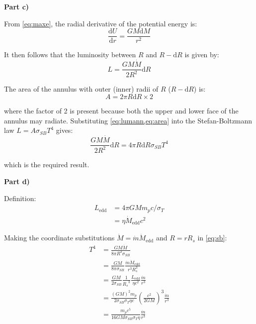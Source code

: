 \documentclass{article}
\newcommand{\diff}[1]{\mathrm{d}#1}
\newcommand{\mysection}[1]{{\large{\bf #1}}}
\begin{document}
\vspace{\baselineskip}
\mysection{Part c)}

From \cref{eq:maxe}, the radial derivative of the potential energy is:
\begin{equation}
  \label{eq:dUdr}
  \frac{\diff{U}}{\diff{r}}=\frac{GM\diff{M}}{r^2}
\end{equation}

It then follows that the luminosity between $R$ and $R-\diff{R}$ is given by:
\begin{equation}
  \label{eq:lumann}
  L=\frac{GM\dot{M}}{2R^2}\diff{R}
\end{equation}

The area of the annulus with outer (inner) radii of $R$ ($R-\diff{R}$) is:
\begin{equation}
  \label{eq:area}
  A=2\pi R\diff{R}\times 2
\end{equation}

where the factor of 2 is present because both the upper and lower face of the annulus may radiate. Substituting \cref{eq:lumann,eq:area} into the Stefan-Boltzmann law $L=A\sigma_{SB}T^4$ gives:
\begin{equation}
  \label{eq:sb}
  \frac{GM\dot{M}}{2R^2}\diff{R}=4\pi R\diff{R}\sigma_{SB}T^4
\end{equation}

which is the required result.

\vspace{\baselineskip}
\mysection{Part d)}

Definition:
\begin{align}
  L_{\mathrm{edd}}&=4\pi GMm_pc/\sigma_T\\
                  &=\eta\dot{M}_{\mathrm{edd}}c^2
\end{align}

Making the coordinate substitutions $\dot{M}=\dot{m}\dot{M}_{\mathrm{edd}}$ and $R=rR_s$ in \cref{eq:sb}:
\begin{align}
  T^4&=\frac{GM\dot{M}}{8\pi R^3\sigma_{SB}}\\
     &=\frac{GM}{8\pi\sigma_{SB}}\frac{\dot{m}\dot{M}_{\mathrm{edd}}}{r^3{R_s^3}}\\
     &=\frac{GM}{2\sigma_{SB}}\frac{1}{{R_s}^3}\frac{L_{\mathrm{edd}}}{\eta c^2}\frac{\dot{m}}{r^3}\\
     &=\frac{(GM)^2m_p}{2\sigma_{SB}\sigma_T\eta c}\left(\frac{c^2}{2GM}\right)^3\frac{\dot{m}}{r^3}\\
  &=\frac{m_pc^5}{16GM\sigma_{SB}\sigma_T\eta}\frac{\dot{m}}{r^3}
\end{align}
\end{document}

